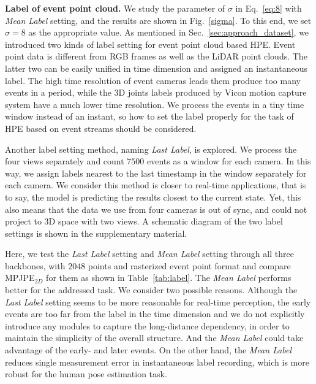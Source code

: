 \documentclass[10pt,twocolumn,letterpaper]{article}
\begin{document}
\noindent\textbf{Label of event point cloud.}
We study the parameter of $\sigma$ in Eq.~\ref{eq:8} with \emph{Mean Label} setting, and the results are shown in Fig.~\ref{sigma}. To this end, we set $\sigma=8$ as the appropriate value. As mentioned in Sec.~\ref{sec:approach_dataset}, we introduced two kinds of label setting for event point cloud based HPE.
Event point data is different from RGB frames as well as the LiDAR point clouds.
The latter two can be easily unified in time dimension and assigned an instantaneous label.
The high time resolution of event cameras leads them produce too many events in a period, while the 3D joints labels produced by Vicon motion capture system have a much lower time resolution.
We process the events in a tiny time window instead of an instant, so how to set the label properly for the task of HPE based on event streams should be considered.

Another label setting method, naming \emph{Last Label}, is explored. We process the four views separately and count $7500$ events as a window for each camera.
In this way, we assign labels nearest to the last timestamp in the window separately for each camera. We consider this method is closer to real-time applications, that is to say, the model is predicting the results closest to the current state.
Yet, this also means that the data we use from four cameras is out of sync, and could not project to 3D space with two views. A schematic diagram of the two label settings is shown in the supplementary material.

Here, we test the \emph{Last Label} setting and \emph{Mean Label} setting through all three backbones, with $2048$ points and rasterized event point format and compare MPJPE$_{2D}$ for them as shown in Table~\ref{tab:label}.
The \emph{Mean Label} performs better for the addressed task.
We consider two possible reasons.
Although the \emph{Last Label} setting seems to be more reasonable for real-time perception, the early events are too far from the label in the time dimension and we do not explicitly introduce any modules to capture the long-distance dependency, in order to maintain the simplicity of the overall structure. And the \emph{Mean Label} could take advantage of the early- and later events. On the other hand, the \emph{Mean Label} reduces single measurement error in instantaneous label recording, which is more robust for the human pose estimation task.
\end{document}
